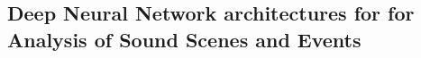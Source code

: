 %
%
%
%

\subsection{Deep Neural Network architectures for for Analysis of Sound Scenes and Events}

